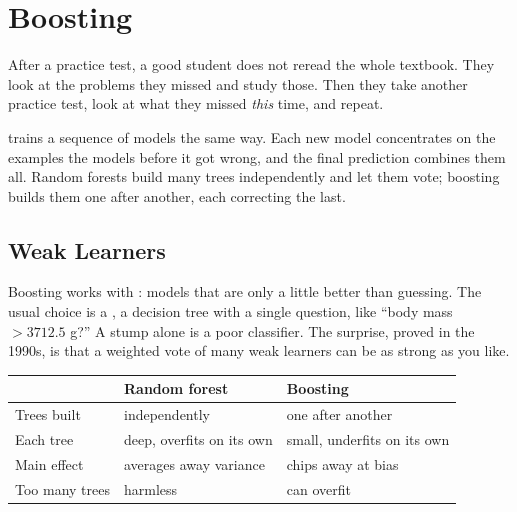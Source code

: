 \chapter{Boosting}

After a practice test, a good student does not reread the whole textbook. They look at the problems they
missed and study those. Then they take another practice test, look at what they missed \emph{this} time, and
repeat.

 trains a sequence of models the same way. Each new model concentrates on the
examples the models before it got wrong, and the final prediction combines them all. Random forests build many
trees independently and let them vote; boosting builds them one after another, each correcting the last.

\section{Weak Learners}
Boosting works with : models that are only a little better than guessing. The usual choice
is a , a decision tree with a single question, like ``body mass
$> 3712.5$ g?'' A stump alone is a poor classifier. The surprise, proved in the 1990s, is that a weighted vote of
many weak learners can be as strong as you like.

\begin{center}
\begin{tabular}{l >{\raggedright\arraybackslash}p{4.5cm} >{\raggedright\arraybackslash}p{4.5cm}}
 & \textbf{Random forest} & \textbf{Boosting} \\
\hline
Trees built & independently & one after another \\
Each tree & deep, overfits on its own & small, underfits on its own \\
Main effect & averages away variance & chips away at bias \\
Too many trees & harmless & can overfit \\
\end{tabular}
\end{center}

